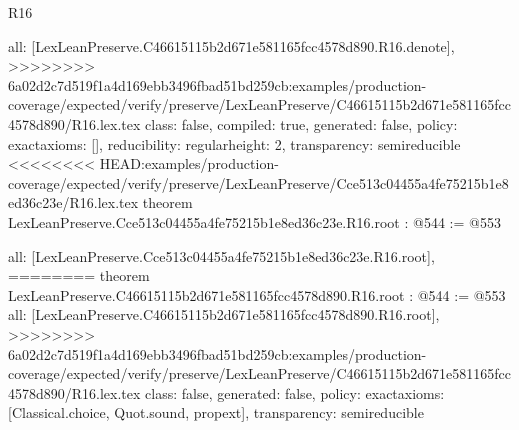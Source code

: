 \begin{lexlean}{R16}
\begin{coremodule}
{{{{{  all: [LexLeanPreserve.C46615115b2d671e581165fcc4578d890.R16.denote],
>>>>>>>> 6a02d2c7d519f1a4d169ebb3496fbad51bd259cb:examples/production-coverage/expected/verify/preserve/LexLeanPreserve/C46615115b2d671e581165fcc4578d890/R16.lex.tex
  class: false,
  compiled: true,
  generated: false,
  policy: exact{axioms: []},
  reducibility: regular{height: 2},
  transparency: semireducible
}
<<<<<<<< HEAD:examples/production-coverage/expected/verify/preserve/LexLeanPreserve/Cce513c04455a4fe75215b1e8ed36c23e/R16.lex.tex
theorem LexLeanPreserve.Cce513c04455a4fe75215b1e8ed36c23e.R16.root : @544 := @553 {
  all: [LexLeanPreserve.Cce513c04455a4fe75215b1e8ed36c23e.R16.root],
========
theorem LexLeanPreserve.C46615115b2d671e581165fcc4578d890.R16.root : @544 := @553 {
  all: [LexLeanPreserve.C46615115b2d671e581165fcc4578d890.R16.root],
>>>>>>>> 6a02d2c7d519f1a4d169ebb3496fbad51bd259cb:examples/production-coverage/expected/verify/preserve/LexLeanPreserve/C46615115b2d671e581165fcc4578d890/R16.lex.tex
  class: false,
  generated: false,
  policy: exact{axioms: [Classical.choice, Quot.sound, propext]},
  transparency: semireducible
}

}}}}}
\end{coremodule}
\end{lexlean}
